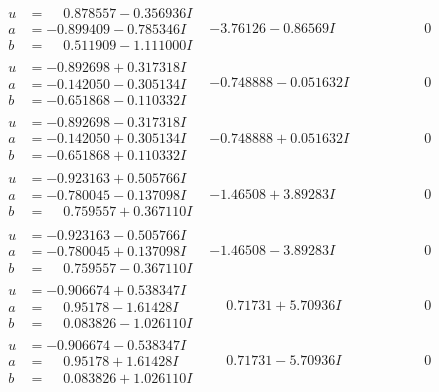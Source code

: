 \documentclass[1p]{elsarticle_modified}
\theoremstyle{definition}
\begin{document}
$$\begin{array}{c|c|c}
\begin{aligned}
u &= \phantom{-}0.878557 - 0.356936 I \\
a &= -0.899409 - 0.785346 I \\
b &= \phantom{-}0.511909 - 1.111000 I\end{aligned}
 & -3.76126 - 0.86569 I & \phantom{-0.000000 } 0 \\ \hline\begin{aligned}
u &= -0.892698 + 0.317318 I \\
a &= -0.142050 - 0.305134 I \\
b &= -0.651868 - 0.110332 I\end{aligned}
 & -0.748888 - 0.051632 I & \phantom{-0.000000 } 0 \\ \hline\begin{aligned}
u &= -0.892698 - 0.317318 I \\
a &= -0.142050 + 0.305134 I \\
b &= -0.651868 + 0.110332 I\end{aligned}
 & -0.748888 + 0.051632 I & \phantom{-0.000000 } 0 \\ \hline\begin{aligned}
u &= -0.923163 + 0.505766 I \\
a &= -0.780045 - 0.137098 I \\
b &= \phantom{-}0.759557 + 0.367110 I\end{aligned}
 & -1.46508 + 3.89283 I & \phantom{-0.000000 } 0 \\ \hline\begin{aligned}
u &= -0.923163 - 0.505766 I \\
a &= -0.780045 + 0.137098 I \\
b &= \phantom{-}0.759557 - 0.367110 I\end{aligned}
 & -1.46508 - 3.89283 I & \phantom{-0.000000 } 0 \\ \hline\begin{aligned}
u &= -0.906674 + 0.538347 I \\
a &= \phantom{-}0.95178 - 1.61428 I \\
b &= \phantom{-}0.083826 - 1.026110 I\end{aligned}
 & \phantom{-}0.71731 + 5.70936 I & \phantom{-0.000000 } 0 \\ \hline\begin{aligned}
u &= -0.906674 - 0.538347 I \\
a &= \phantom{-}0.95178 + 1.61428 I \\
b &= \phantom{-}0.083826 + 1.026110 I\end{aligned}
 & \phantom{-}0.71731 - 5.70936 I & \phantom{-0.000000 } 0 \\ \hline\begin{aligned}

\end{aligned}
\end{array}$$
\end{document}
